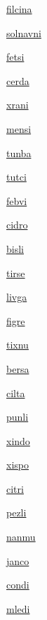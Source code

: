 {\hyperlink{val:filcina}{filcina}}{}{}{}

{\hyperlink{val:solnavni}{solnavni}}{}{}{}

{\hyperlink{val:fetsi}{fetsi}}{}{}{}

{\hyperlink{val:cerda}{cerda}}{}{}{}

{\hyperlink{val:xrani}{xrani}}{}{}{}

{\hyperlink{val:mensi}{mensi}}{}{}{}

{\hyperlink{val:tunba}{tunba}}{}{}{}

{\hyperlink{val:tutci}{tutci}}{}{}{}

{\hyperlink{val:febvi}{febvi}}{}{}{}

{\hyperlink{val:cidro}{cidro}}{}{}{}

{\hyperlink{val:bisli}{bisli}}{}{}{}

{\hyperlink{val:tirse}{tirse}}{}{}{}

{\hyperlink{val:livga}{livga}}{}{}{}

{\hyperlink{val:figre}{figre}}{}{}{}

{\hyperlink{val:tixnu}{tixnu}}{}{}{}

{\hyperlink{val:bersa}{bersa}}{}{}{}

{\hyperlink{val:cilta}{cilta}}{}{}{}

{\hyperlink{val:punli}{punli}}{}{}{}

{\hyperlink{val:xindo}{xindo}}{}{}{}

{\hyperlink{val:xispo}{xispo}}{}{}{}

{\hyperlink{val:citri}{citri}}{}{}{}

{\hyperlink{val:pezli}{pezli}}{}{}{}

{\hyperlink{val:nanmu}{nanmu}}{}{}{}

{\hyperlink{val:janco}{janco}}{}{}{}

{\hyperlink{val:condi}{condi}}{}{}{}

{\hyperlink{val:mledi}{mledi}}{}{}{}

